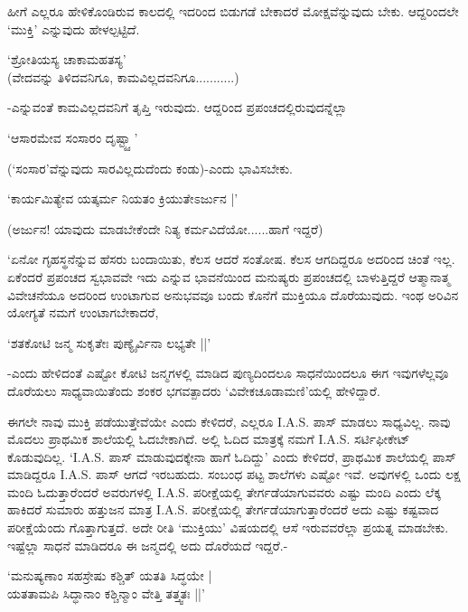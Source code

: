 ಹೀಗೆ ಎಲ್ಲರೂ ಹೇಳಿಕೊಂಡಿರುವ ಕಾಲದಲ್ಲಿ ಇದರಿಂದ ಬಿಡುಗಡೆ ಬೇಕಾದರೆ ಮೋಕ್ಷವೆನ್ನುವುದು ಬೇಕು. ಆದ್ದರಿಂದಲೇ `ಮುಕ್ತಿ' ಎನ್ನುವುದು ಹೇಳಲ್ಪಟ್ಟಿದೆ.

\begin{shloka}
`ಶ್ರೋತಿಯಸ್ಯ ಚಾಕಾಮಹತಸ್ಯ'\\
(ವೇದವನ್ನು ತಿಳಿದವನಿಗೂ, ಕಾಮವಿಲ್ಲದವನಿಗೂ...........)
\end{shloka}

-ಎನ್ನುವಂತೆ ಕಾಮವಿಲ್ಲದವನಿಗೆ ತೃಪ್ತಿ ಇರುವುದು. ಆದ್ದರಿಂದ ಪ್ರಪಂಚದಲ್ಲಿರುವುದನ್ನೆಲ್ಲಾ

\begin{shloka}
`ಆಸಾರಮೇವ ಸಂಸಾರಂ ದೃಷ್ಟ್ಯ್ವಾ'
\end{shloka}

(`ಸಂಸಾರ'ವೆನ್ನುವುದು ಸಾರವಿಲ್ಲದುದೆಂದು ಕಂಡು)-ಎಂದು ಭಾವಿಸಬೇಕು.

\begin{shloka}
`ಕಾರ್ಯಮಿತ್ಯೇವ ಯತ್ಕರ್ಮ ನಿಯತಂ ಕ್ರಿಯುತೇಽರ್ಜುನ |'
\end{shloka}

(ಅರ್ಜುನ! ಯಾವುದು ಮಾಡಬೇಕೆಂದೇ ನಿತ್ಯ ಕರ್ಮವಿದೆಯೋ......ಹಾಗೆ ಇದ್ದರೆ)

`ಏನೋ ಗೃಹಸ್ಥನೆನ್ನುವ ಹೆಸರು ಬಂದಾಯಿತು, ಕೆಲಸ ಆದರೆ ಸಂತೋಷ. ಕೆಲಸ ಆಗದಿದ್ದರೂ ಅದರಿಂದ ಚಿಂತೆ ಇಲ್ಲ. ಏಕೆಂದರೆ ಪ್ರಪಂಚದ ಸ್ವಭಾವವೇ ಇದು ಎನ್ನುವ ಭಾವನೆಯಿಂದ ಮನುಷ್ಯರು ಪ್ರಪಂಚದಲ್ಲಿ ಬಾಳುತ್ತಿದ್ದರೆ ಆತ್ಮಾನಾತ್ಮ ವಿವೇಚನೆಯೂ ಅದರಿಂದ ಉಂಟಾಗುವ ಅನುಭವವೂ ಬಂದು ಕೊನೆಗೆ ಮುಕ್ತಿಯೂ ದೊರೆಯುವುದು. ಇಂಥ ಅರಿವಿನ ಯೋಗ್ಯತೆ ನಮಗೆ ಉಂಟಾಗಬೇಕಾದರೆ,

\begin{shloka}
`ಶತಕೋಟಿ ಜನ್ಮ ಸುಕೃತೇಃ ಪುಣ್ಯೈರ್ವಿನಾ ಲಭ್ಯತೇ ||'
\end{shloka}

-ಎಂದು ಹೇಳಿದಂತೆ ಎಷ್ಟೋ ಕೋಟಿ ಜನ್ಮಗಳಲ್ಲಿ ಮಾಡಿದ ಪುಣ್ಯದಿಂದಲೂ ಸಾಧನೆಯಿಂದಲೂ ಈಗ ಇವುಗಳೆಲ್ಲವೂ ದೊರೆಯಲು ಸಾಧ್ಯವಾಯಿತೆಂದು ಶಂಕರ ಭಗವತ್ಪಾದರು `ವಿವೇಕಚೂಡಾಮಣಿ'ಯಲ್ಲಿ ಹೇಳಿದ್ದಾರೆ.

ಈಗಲೇ ನಾವು ಮುಕ್ತಿ ಪಡೆಯುತ್ತೇವೆಯೇ ಎಂದು ಕೇಳಿದರೆ, ಎಲ್ಲರೂ {\eng I.A.S.} ಪಾಸ್ ಮಾಡಲು ಸಾಧ್ಯವಿಲ್ಲ. ನಾವು ಮೊದಲು ಪ್ರಾಥಮಿಕ ಶಾಲೆಯಲ್ಲಿ ಓದಬೇಕಾಗಿದೆ. ಅಲ್ಲಿ ಓದಿದ ಮಾತ್ರಕ್ಕೆ ನಮಗೆ {\eng I.A.S.} ಸರ್ಟಿಫೀಕೇಟ್ ಕೊಡುವುದಿಲ್ಲ. `{\eng I.A.S.} ಪಾಸ್ ಮಾಡುವುದಕ್ಕೇನಾ ಹಾಗೆ ಓದಿದ್ದು' ಎಂದು ಕೇಳಿದರೆ, ಪ್ರಾಥಮಿಕ ಶಾಲೆಯಲ್ಲಿ ಪಾಸ್ ಮಾಡಿದ್ದರೂ {\eng I.A.S.} ಪಾಸ್ ಆಗದೆ ಇರಬಹುದು. ಸಂಬಂಧ ಪಟ್ಟ ಶಾಲೆಗಳು ಎಷ್ಟೋ ಇವೆ. ಅವುಗಳಲ್ಲಿ ಒಂದು ಲಕ್ಷ ಮಂದಿ ಓದುತ್ತಾರೆಂದರೆ ಅವರುಗಳಲ್ಲಿ {\eng I.A.S.} ಪರೀಕ್ಷೆಯಲ್ಲಿ ತೇರ್ಗಡೆಯಾಗುವವರು ಎಷ್ಟು ಮಂದಿ ಎಂದು ಲೆಕ್ಕ ಹಾಕಿದರೆ ಸುಮಾರು ಹತ್ತುಜನ ಮಾತ್ರ {\eng I.A.S.} ಪರೀಕ್ಷೆಯಲ್ಲಿ ತೇರ್ಗಡೆಯಾಗುತ್ತಾರೆಂದರೆ ಅದು ಎಷ್ಟು ಕಷ್ಟವಾದ ಪರೀಕ್ಷೆಯೆಂದು ಗೊತ್ತಾಗುತ್ತದೆ. ಅದೇ ರೀತಿ `ಮುಕ್ತಿಯು' ವಿಷಯದಲ್ಲಿ ಆಸೆ ಇರುವವರೆಲ್ಲಾ ಪ್ರಯತ್ನ ಮಾಡಬೇಕು. ಇಷ್ಟೆಲ್ಲಾ ಸಾಧನೆ ಮಾಡಿದರೂ ಈ ಜನ್ಮದಲ್ಲಿ ಅದು ದೊರೆಯದೆ ಇದ್ದರೆ.-

\begin{shloka}
`ಮನುಷ್ಯಣಾಂ ಸಹಸ್ರೇಷು ಕಶ್ಚಿತ್ ಯತತಿ ಸಿದ್ಧಯೇ |\\
ಯತತಾಮಪಿ ಸಿದ್ಧಾನಾಂ ಕಶ್ಚಿನ್ಮಾಂ ವೇತ್ತಿ ತತ್ತ್ವತಃ ||'
\end{shloka}


